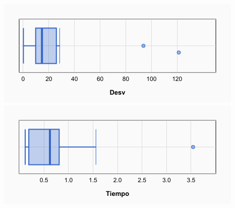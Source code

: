 \documentclass[a4paper, 12pt]{article}
\begin{document}
\begin{center}
         \includegraphics[scale=0.5]{boxplot-ageox-desv}
         \includegraphics[scale=0.5]{boxplot-ageox-time}
      \end{center}
      
      
      
      \newpage
\end{document}
